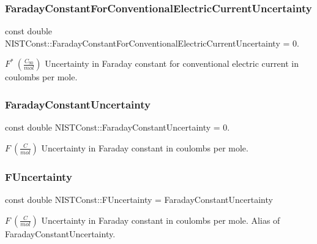\subsubsection{\texorpdfstring{Faraday\+Constant\+For\+Conventional\+Electric\+Current\+Uncertainty}{FaradayConstantForConventionalElectricCurrentUncertainty}}
{\footnotesize\ttfamily const double N\+I\+S\+T\+Const\+::\+Faraday\+Constant\+For\+Conventional\+Electric\+Current\+Uncertainty = 0.}

$F^\ast \ (\frac{C_{90}}{mol})$ Uncertainty in Faraday constant for conventional electric current in coulombs per mole. \mbox{\label{group___n_i_s_t_const-_faraday_constant_ga9b0f9181caac73b346e91602673272c1}} 
\subsubsection{\texorpdfstring{Faraday\+Constant\+Uncertainty}{FaradayConstantUncertainty}}
{\footnotesize\ttfamily const double N\+I\+S\+T\+Const\+::\+Faraday\+Constant\+Uncertainty = 0.}

$F \ (\frac{C}{mol})$ Uncertainty in Faraday constant in coulombs per mole. \mbox{\label{group___n_i_s_t_const-_faraday_constant_ga00c3ecdf32da676583d7f64f8a6a4e07}} 
\subsubsection{\texorpdfstring{F\+Uncertainty}{FUncertainty}}
{\footnotesize\ttfamily const double N\+I\+S\+T\+Const\+::\+F\+Uncertainty = Faraday\+Constant\+Uncertainty}

$F \ (\frac{C}{mol})$ Uncertainty in Faraday constant in coulombs per mole. Alias of Faraday\+Constant\+Uncertainty. 
